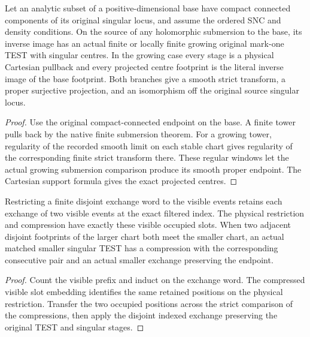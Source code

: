 \begin{theorem}
\label{hir:g8-submersion-compact-connected-history}
\leanok
Let an analytic subset of a positive-dimensional base have compact
connected components of its original singular locus, and assume the
ordered SNC and density conditions. On the source of any holomorphic
submersion to the base, its inverse image has an actual finite or
locally finite growing original mark-one TEST with singular centres.
In the growing case every stage is a physical Cartesian pullback
and every projected centre footprint is the literal inverse image
of the base footprint. Both branches give a smooth strict transform,
a proper surjective projection, and an isomorphism off the original
source singular locus.
\end{theorem}
\begin{proof}
Use the original compact-connected endpoint on the base. A finite
tower pulls back by the native finite submersion theorem. For a
growing tower, regularity of the recorded smooth limit on each
stable chart gives regularity of the corresponding finite strict
transform there. These regular windows let the actual growing
submersion comparison produce its smooth proper endpoint. The
Cartesian support formula gives the exact projected centres.
\end{proof}

\begin{proposition}
\label{hir:g8-filtered-exchange-words}
\leanok
Restricting a finite disjoint exchange word to the visible events
retains each exchange of two visible events at the exact filtered
index. The physical restriction and compression have exactly these
visible occupied slots. When two adjacent disjoint footprints of the
larger chart both meet the smaller chart, an actual matched smaller
singular TEST has a compression with the corresponding consecutive
pair and an actual smaller exchange preserving the endpoint.
\end{proposition}
\begin{proof}
Count the visible prefix and induct on the exchange word. The
compressed visible slot embedding identifies the same retained
positions on the physical restriction. Transfer the two occupied
positions across the strict comparison of the compressions, then
apply the disjoint indexed exchange preserving the original TEST
and singular stages.
\end{proof}

